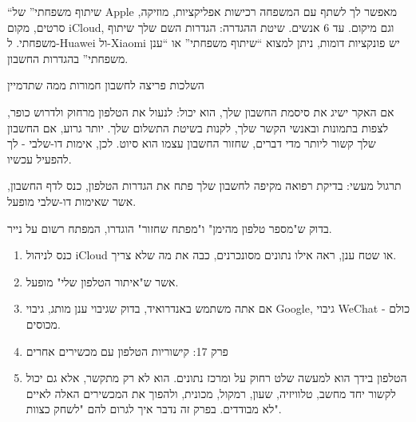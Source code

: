 “שיתוף משפחתי” של Apple מאפשר לך לשתף עם המשפחה רכישות אפליקציות, מוזיקה, סרטים, מקום iCloud, וגם מיקום. עד 6 אנשים. שיטת ההגדרה: הגדרות השם שלך שיתוף משפחתי. ל-Huawei ול-Xiaomi יש פונקציות דומות, ניתן למצוא “שיתוף משפחתי” או “ענן משפחתי” בהגדרות החשבון.


השלכות פריצה לחשבון חמורות ממה שתדמיין

אם האקר ישיג את סיסמת החשבון שלך, הוא יכול: לנעול את הטלפון מרחוק ולדרוש כופר, לצפות בתמונות ובאנשי הקשר שלך, לקנות בשיטת התשלום שלך. יותר גרוע, אם החשבון שלך קשור ליותר מדי דברים, שחזור החשבון עצמו הוא סיוט. לכן, אימות דו-שלבי - לך להפעיל עכשיו.

\begin{tcbwarn}{תרגול מעשי: בדיקת רפואה מקיפה לחשבון שלך}
פתח את הגדרות הטלפון, כנס לדף החשבון, אשר שאימות דו-שלבי מופעל.

\end{tcbwarn}

\begin{tcbpractice}{בדוק ש"מספר טלפון מהימן" ו"מפתח שחזור" הוגדרו, המפתח רשום על נייר.}
\begin{enumerate}
  \item כנס לניהול iCloud או שטח ענן, ראה אילו נתונים מסונכרנים, כבה את מה שלא צריך.
  \item אשר ש"איתור הטלפון שלי" מופעל.
  \item אם אתה משתמש באנדרואיד, בדוק שגיבוי ענן מותג, גיבוי Google, גיבוי WeChat - כולם מכוסים.
  \item פרק 17: קישוריות הטלפון עם מכשירים אחרים
  \item הטלפון בידך הוא למעשה שלט רחוק על ומרכז נתונים. הוא לא רק מתקשר, אלא גם יכול לקשור יחד מחשב, טלוויזיה, שעון, רמקול, מכונית, ולהפוך את המכשירים האלה לאיים לא מבודדים. בפרק זה נדבר איך לגרום להם "לשחק כצוות".
\end{enumerate}

\end{tcbpractice}

